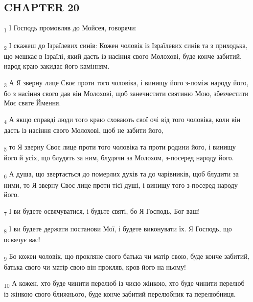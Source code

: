 \subsection{CHAPTER 20}
\begin{tcolorbox}
\textsubscript{1} І Господь промовляв до Мойсея, говорячи:
\end{tcolorbox}
\begin{tcolorbox}
\textsubscript{2} І скажеш до Ізраїлевих синів: Кожен чоловік із Ізраїлевих синів та з приходька, що мешкає в Ізраїлі, який дасть із насіння свого Молохові, буде конче забитий, народ краю закидає його камінням.
\end{tcolorbox}
\begin{tcolorbox}
\textsubscript{3} А Я зверну лице Своє проти того чоловіка, і винищу його з-поміж народу його, бо з насіння свого дав він Молохові, щоб занечистити святиню Мою, збезчестити Моє святе Ймення.
\end{tcolorbox}
\begin{tcolorbox}
\textsubscript{4} А якщо справді люди того краю сховають свої очі від того чоловіка, коли він дасть із насіння свого Молохові, щоб не забити його,
\end{tcolorbox}
\begin{tcolorbox}
\textsubscript{5} то Я зверну Своє лице проти того чоловіка та проти родини його, і винищу його й усіх, що блудять за ним, блудячи за Молохом, з-посеред народу його.
\end{tcolorbox}
\begin{tcolorbox}
\textsubscript{6} А душа, що звертається до померлих духів та до чарівників, щоб блудити за ними, то Я зверну Своє лице проти тієї душі, і винищу того з-посеред народу його.
\end{tcolorbox}
\begin{tcolorbox}
\textsubscript{7} І ви будете освячуватися, і будьте святі, бо Я Господь, Бог ваш!
\end{tcolorbox}
\begin{tcolorbox}
\textsubscript{8} І ви будете держати постанови Мої, і будете виконувати їх. Я Господь, що освячує вас!
\end{tcolorbox}
\begin{tcolorbox}
\textsubscript{9} Бо кожен чоловік, що прокляне свого батька чи матір свою, буде конче забитий, батька свого чи матір свою він прокляв, кров його на ньому!
\end{tcolorbox}
\begin{tcolorbox}
\textsubscript{10} А кожен, хто буде чинити перелюб із чиєю жінкою, хто буде чинити перелюб із жінкою свого ближнього, буде конче забитий перелюбник та перелюбниця.
\end{tcolorbox}
